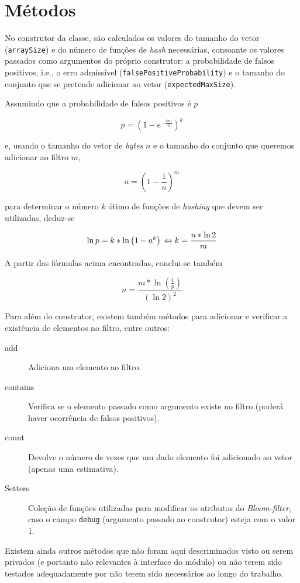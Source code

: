 \documentclass[a4paper,11pt,openright,oneside]{report}
\begin{document}
\section{Métodos}

No construtor da classe, são calculados os valores do tamanho do vetor (\texttt{arraySize}) e do número de funções de \textit{hash} necessárias, consoante os valores passados como argumentos do próprio construtor: a probabilidade de falsos positivos, i.e., o erro admissível (\texttt{falsePositiveProbability}) e o tamanho do conjunto que se pretende adicionar ao vetor (\texttt{expectedMaxSize}). 

Assumindo que a probabilidade de falsos positivos é $p$

$$ p =  \left(1 - e^{-\frac{km}{n}}\right)^k $$

e, usando o tamanho do vetor de \textit{bytes} $n$ e o tamanho do conjunto que queremos adicionar ao filtro $m$,

$$ a = \left(1 - \frac{1}{n}\right)^m $$

para determinar o número $k$ ótimo de funções de \textit{hashing} que devem ser utilizadas, deduz-se

$$ \ln p = k * \ln \left(1 - a^k\right) \\
\Leftrightarrow k =  \frac{n * \ln 2}{m}$$

A partir das fórmulas acima encontradas, conclui-se também

$$ n = \frac{m * \ln \left(\frac{1}{p}\right)}{\left(\ln 2\right) ^ 2} $$

Para além do construtor, existem também métodos para adicionar e verificar a existência de elementos no filtro, entre outros:

\begin{description}
\item[add]
Adiciona um elemento ao filtro.
\item[contains]
Verifica se o elemento passado como argumento existe no filtro (poderá haver ocorrência de falsos positivos).
\item[count]
Devolve o número de vezes que um dado elemento foi adicionado ao vetor (apenas uma estimativa).
\item[Setters]
Coleção de funções utilizadas para modificar os atributos do \textit{Bloom-filter}, caso o campo \texttt{debug} (argumento passado ao construtor) esteja com o valor 1.
\end{description}

Existem ainda outros métodos que não foram aqui descriminados visto ou serem privados (e portanto não relevantes à interface do módulo) ou não terem sido testados adequadamente por não terem sido necessários ao longo do trabalho.
\end{document}
